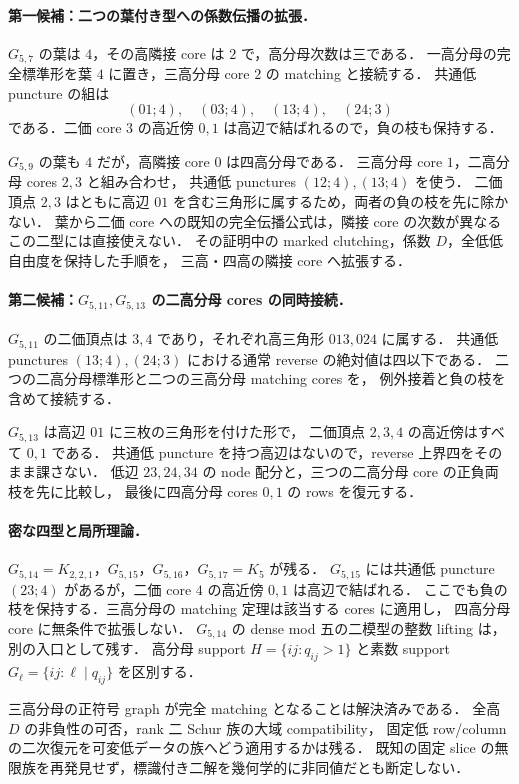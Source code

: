 \paragraph{第一候補：二つの葉付き型への係数伝播の拡張．}
$G_{5,7}$ の葉は $4$，その高隣接 core は $2$ で，高分母次数は三である．
一高分母の完全標準形を葉 $4$ に置き，三高分母 core $2$ の matching と接続する．
共通低 puncture の組は
\[
 (01;4),\quad(03;4),\quad(13;4),\quad(24;3)
\]
である．二価 core $3$ の高近傍 $0,1$ は高辺で結ばれるので，負の枝も保持する．

$G_{5,9}$ の葉も $4$ だが，高隣接 core $0$ は四高分母である．
三高分母 core $1$，二高分母 cores $2,3$ と組み合わせ，
共通低 punctures $(12;4),(13;4)$ を使う．
二価頂点 $2,3$ はともに高辺 $01$ を含む三角形に属するため，両者の負の枝を先に除かない．
葉から二価 core への既知の完全伝播公式は，隣接 core の次数が異なるこの二型には直接使えない．
その証明中の marked clutching，係数 $D$，全低低自由度を保持した手順を，
三高・四高の隣接 core へ拡張する．

\paragraph{第二候補：$G_{5,11},G_{5,13}$ の二高分母 cores の同時接続．}
$G_{5,11}$ の二価頂点は $3,4$ であり，それぞれ高三角形 $013,024$ に属する．
共通低 punctures $(13;4),(24;3)$ における通常 reverse の絶対値は四以下である．
二つの二高分母標準形と二つの三高分母 matching cores を，
例外接着と負の枝を含めて接続する．

$G_{5,13}$ は高辺 $01$ に三枚の三角形を付けた形で，
二価頂点 $2,3,4$ の高近傍はすべて $0,1$ である．
共通低 puncture を持つ高辺はないので，reverse 上界四をそのまま課さない．
低辺 $23,24,34$ の node 配分と，三つの二高分母 core の正負両枝を先に比較し，
最後に四高分母 cores $0,1$ の rows を復元する．

\paragraph{密な四型と局所理論．}
$G_{5,14}=K_{2,2,1}$，$G_{5,15}$，$G_{5,16}$，$G_{5,17}=K_5$ が残る．
$G_{5,15}$ には共通低 puncture $(23;4)$ があるが，二価 core $4$ の高近傍 $0,1$ は高辺で結ばれる．
ここでも負の枝を保持する．三高分母の matching 定理は該当する cores に適用し，
四高分母 core に無条件で拡張しない．
$G_{5,14}$ の dense mod 五の二模型の整数 lifting は，別の入口として残す．
高分母 support $H=\{ij:q_{ij}>1\}$ と素数 support $G_\ell=\{ij:\ell\mid q_{ij}\}$ を区別する．

三高分母の正符号 graph が完全 matching となることは解決済みである．
全高 $D$ の非負性の可否，rank 二 Schur 族の大域 compatibility，
固定低 row/column の二次復元を可変低データの族へどう適用するかは残る．
既知の固定 slice の無限族を再発見せず，標識付き二解を幾何学的に非同値だとも断定しない．

